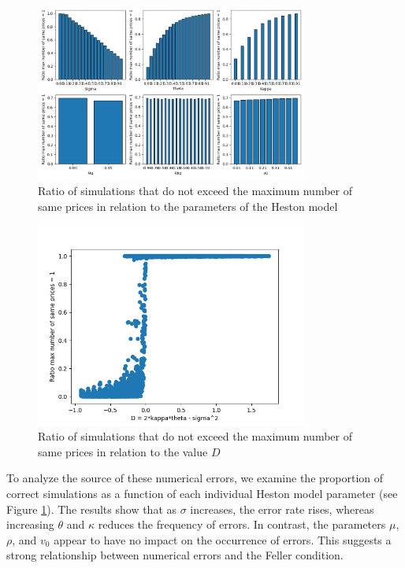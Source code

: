 \begin{figure}
    \centering
    \includegraphics[width=0.8\textwidth]{img/max_number_of_same_prices_ratio_parameters.png}
    \caption{Ratio of simulations that do not exceed the maximum number of same prices in relation to the parameters of the Heston model}
    \label{fig:max_number_of_same_prices_ratio_parameters}
\end{figure}

\begin{figure}
    \centering
    \includegraphics[width=0.8\textwidth]{img/max_number_of_same_prices_ratio_feller_diff.png}
    \caption{Ratio of simulations that do not exceed the maximum number of same prices in relation to the value $D$}
    \label{fig:max_number_of_same_prices_ratio_D}
\end{figure}

To analyze the source of these numerical errors, we examine the proportion of correct simulations as a function of each individual Heston model parameter (see Figure \ref{fig:max_number_of_same_prices_ratio_parameters}). The results show that as $\sigma$ increases, the error rate rises, whereas increasing $\theta$ and $\kappa$ reduces the frequency of errors. In contrast, the parameters $\mu$, $\rho$, and $v_0$ appear to have no impact on the occurrence of errors. This suggests a strong relationship between numerical errors and the Feller condition.

